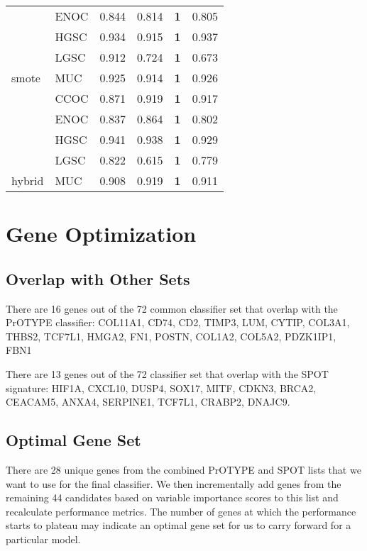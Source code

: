 \documentclass[
]{report}
\begin{document}
\begin{table}
\begin{tabular}[t]{l|l|l|l|l|l}
\cline{2-6}
 & ENOC & 0.844 & 0.814 & \textbf{1} & 0.805\\
\cline{2-6}
 & HGSC & 0.934 & 0.915 & \textbf{1} & 0.937\\
\cline{2-6}
 & LGSC & 0.912 & 0.724 & \textbf{1} & 0.673\\
\cline{2-6}
\multirow{-5}{*}{\raggedright\arraybackslash smote} & MUC & 0.925 & 0.914 & \textbf{1} & 0.926\\
\cline{1-6}
 & CCOC & 0.871 & 0.919 & \textbf{1} & 0.917\\
\cline{2-6}
 & ENOC & 0.837 & 0.864 & \textbf{1} & 0.802\\
\cline{2-6}
 & HGSC & 0.941 & 0.938 & \textbf{1} & 0.929\\
\cline{2-6}
 & LGSC & 0.822 & 0.615 & \textbf{1} & 0.779\\
\cline{2-6}
\multirow{-5}{*}{\raggedright\arraybackslash hybrid} & MUC & 0.908 & 0.919 & \textbf{1} & 0.911\\
\hline
\end{tabular}
\end{table}

\hypertarget{gene-optimization}{%
\section{Gene Optimization}\label{gene-optimization}}

\hypertarget{overlap-with-other-sets}{%
\subsection{Overlap with Other Sets}\label{overlap-with-other-sets}}

There are 16 genes out of the 72 common classifier set that overlap with the PrOTYPE classifier: COL11A1, CD74, CD2, TIMP3, LUM, CYTIP, COL3A1, THBS2, TCF7L1, HMGA2, FN1, POSTN, COL1A2, COL5A2, PDZK1IP1, FBN1

There are 13 genes out of the 72 classifier set that overlap with the SPOT signature: HIF1A, CXCL10, DUSP4, SOX17, MITF, CDKN3, BRCA2, CEACAM5, ANXA4, SERPINE1, TCF7L1, CRABP2, DNAJC9.

\hypertarget{optimal-gene-set}{%
\subsection{Optimal Gene Set}\label{optimal-gene-set}}

There are 28 unique genes from the combined PrOTYPE and SPOT lists that we want to use for the final classifier. We then incrementally add genes from the remaining 44 candidates based on variable importance scores to this list and recalculate performance metrics. The number of genes at which the performance starts to plateau may indicate an optimal gene set for us to carry forward for a particular model.
\end{document}
